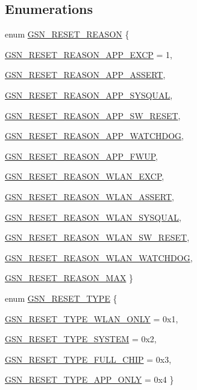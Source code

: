 \subsection*{Enumerations}
\begin{DoxyCompactItemize}
\item 
enum \hyperlink{a00594_acbd18ae49fbafe15903e1cf609761301}{GSN\_\-RESET\_\-REASON} \{ \par
\hyperlink{a00594_acbd18ae49fbafe15903e1cf609761301a1943a02ed4f19aaa6c9ab160e8263309}{GSN\_\-RESET\_\-REASON\_\-APP\_\-EXCP} =  1, 
\par
\hyperlink{a00594_acbd18ae49fbafe15903e1cf609761301a445f991a6b1d8465ef34c393531b95b1}{GSN\_\-RESET\_\-REASON\_\-APP\_\-ASSERT}, 
\par
\hyperlink{a00594_acbd18ae49fbafe15903e1cf609761301a1ae793e1c52dd641258500e065c219bf}{GSN\_\-RESET\_\-REASON\_\-APP\_\-SYSQUAL}, 
\par
\hyperlink{a00594_acbd18ae49fbafe15903e1cf609761301a8bf5ac85d33bca7388e8bd5478eff9f0}{GSN\_\-RESET\_\-REASON\_\-APP\_\-SW\_\-RESET}, 
\par
\hyperlink{a00594_acbd18ae49fbafe15903e1cf609761301a2d69df9fa4190c15dbd2f5839450993e}{GSN\_\-RESET\_\-REASON\_\-APP\_\-WATCHDOG}, 
\par
\hyperlink{a00594_acbd18ae49fbafe15903e1cf609761301a1ced78c01ca6b4192859efd8d4a732bc}{GSN\_\-RESET\_\-REASON\_\-APP\_\-FWUP}, 
\par
\hyperlink{a00594_acbd18ae49fbafe15903e1cf609761301a0928a2b8b314d9dc9f39e899a484a0f5}{GSN\_\-RESET\_\-REASON\_\-WLAN\_\-EXCP}, 
\par
\hyperlink{a00594_acbd18ae49fbafe15903e1cf609761301a676e7c66c7e3bd6ab376809846405383}{GSN\_\-RESET\_\-REASON\_\-WLAN\_\-ASSERT}, 
\par
\hyperlink{a00594_acbd18ae49fbafe15903e1cf609761301a2e82cf32e518e295b0c4c861204cf073}{GSN\_\-RESET\_\-REASON\_\-WLAN\_\-SYSQUAL}, 
\par
\hyperlink{a00594_acbd18ae49fbafe15903e1cf609761301a1397500a9b60883c5fd4bb6d249f3be5}{GSN\_\-RESET\_\-REASON\_\-WLAN\_\-SW\_\-RESET}, 
\par
\hyperlink{a00594_acbd18ae49fbafe15903e1cf609761301aa601769075a34b4ee21fd763b15d4919}{GSN\_\-RESET\_\-REASON\_\-WLAN\_\-WATCHDOG}, 
\par
\hyperlink{a00594_acbd18ae49fbafe15903e1cf609761301a6fb8dc3a7192918e84fb04de70b22bcf}{GSN\_\-RESET\_\-REASON\_\-MAX}
 \}
\item 
enum \hyperlink{a00594_ab40c966b5421550aa37ce97baba465ca}{GSN\_\-RESET\_\-TYPE} \{ \par
\hyperlink{a00594_ab40c966b5421550aa37ce97baba465caac7e35a89fea73a8403da692b10a1bea8}{GSN\_\-RESET\_\-TYPE\_\-WLAN\_\-ONLY} =  0x1, 
\par
\hyperlink{a00594_ab40c966b5421550aa37ce97baba465caa7364cafb8583292edaa6ffa9aefaed8c}{GSN\_\-RESET\_\-TYPE\_\-SYSTEM} =  0x2, 
\par
\hyperlink{a00594_ab40c966b5421550aa37ce97baba465caa453509549e4644df5c380d543c887ab6}{GSN\_\-RESET\_\-TYPE\_\-FULL\_\-CHIP} =  0x3, 
\par
\hyperlink{a00594_ab40c966b5421550aa37ce97baba465caa4697d96346ecc1f65867a2e865e37bf0}{GSN\_\-RESET\_\-TYPE\_\-APP\_\-ONLY} =  0x4
 \}
\end{DoxyCompactItemize}
